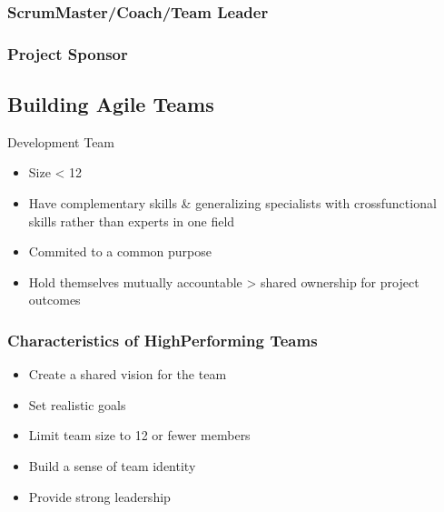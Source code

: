 \documentclass[letterpaper,10pt,english]{jupyterBook}
\begin{document}
\subsubsection{ScrumMaster/Coach/Team Leader}
\label{\detokenize{APM/agile:scrummaster-coach-team-leader}}

\subsubsection{Project Sponsor}
\label{\detokenize{APM/agile:project-sponsor}}

\subsection{Building Agile Teams}
\label{\detokenize{APM/agile:building-agile-teams}}
\sphinxAtStartPar
Development Team
\begin{itemize}
\item {} 
\sphinxAtStartPar
Size < 12

\item {} 
\sphinxAtStartPar
Have complementary skills \& generalizing specialists with cross\sphinxhyphen{}functional skills rather than experts in one field

\item {} 
\sphinxAtStartPar
Commited to a common purpose

\item {} 
\sphinxAtStartPar
Hold themselves mutually accountable \sphinxhyphen{}> shared ownership for project outcomes

\end{itemize}


\subsubsection{Characteristics of High\sphinxhyphen{}Performing Teams}
\label{\detokenize{APM/agile:characteristics-of-high-performing-teams}}\begin{itemize}
\item {} 
\sphinxAtStartPar
Create a shared vision for the team

\item {} 
\sphinxAtStartPar
Set realistic goals

\item {} 
\sphinxAtStartPar
Limit team size to 12 or fewer members

\item {} 
\sphinxAtStartPar
Build a sense of team identity

\item {} 
\sphinxAtStartPar
Provide strong leadership

\end{itemize}
\end{document}

